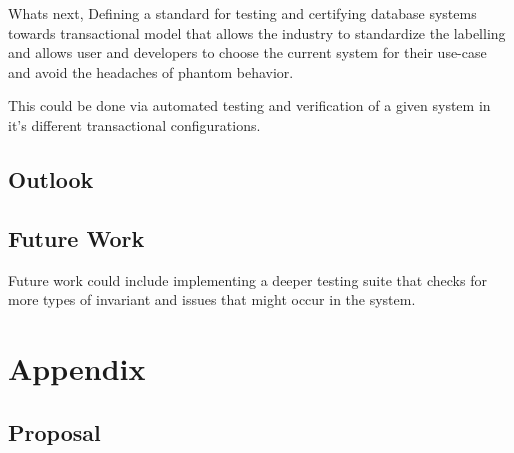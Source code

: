 \documentclass[a4paper,10pt,titlepage]{report}
\begin{document}
 
Whats next, Defining a standard for testing and certifying database systems towards transactional model that allows the industry to standardize the labelling and allows user and developers to choose the current system for their use-case and avoid the headaches of phantom behavior.

This could be done via automated testing and verification of a given system in it's different transactional configurations.

\section*{Outlook}


\section{Future Work}
Future work could include implementing a deeper testing suite that checks for more types of invariant and issues that might occur in the system.





\newpage


\chapter{Appendix}

\pagestyle{empty}
\printbibliography


\section{Proposal}




\end{document}
